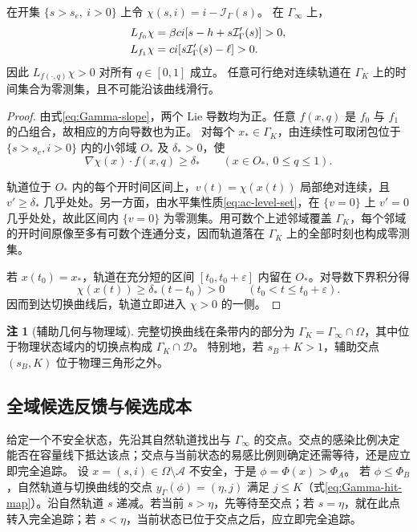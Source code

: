 \documentclass[lang=cn,a4paper,newtx]{elegantpaper}
\theoremstyle{plain}
\theoremstyle{definition}
\newtheorem{paperremark}[theorem]{注}
\newcommand{\Acal}{\mathcal A}
\newcommand{\Dcal}{\mathcal D}
\begin{document}
\begin{lemma}[所有允许方向均严格横穿切换曲线]
\label{lem:strict-crossing}
在开集 $\{s>s_e,\ i>0\}$ 上令 $\chi(s,i)=i-\mathcal I_\Gamma(s)$。
在 $\Gamma_\infty$ 上，
\begin{align}
L_{f_0}\chi&=\beta ci[s-h+s\mathcal I_\Gamma'(s)]>0,\notag\\
L_{f_1}\chi&=ci[s\mathcal I_\Gamma'(s)-\ell]>0.\label{eq:strict-crossing}
\end{align}
因此 $L_{f(\cdot,q)}\chi>0$ 对所有 $q\in[0,1]$ 成立。
任意可行绝对连续轨道在 $\Gamma_K$ 上的时间集合为零测集，且不可能沿该曲线滑行。
\end{lemma}
\begin{proof}
由式\eqref{eq:Gamma-slope}，两个 Lie 导数均为正。任意 $f(x,q)$ 是 $f_0$ 与 $f_1$ 的凸组合，故相应的方向导数也为正。
对每个 $x_*\in\Gamma_K$，由连续性可取闭包位于 $\{s>s_e,i>0\}$ 内的小邻域 $O_*$ 及 $\delta_*>0$，使
\[
\nabla\chi(x)\cdot f(x,q)\ge\delta_*\qquad(x\in O_*,\ 0\le q\le1).
\]

轨道位于 $O_*$ 内的每个开时间区间上，$v(t)=\chi(x(t))$ 局部绝对连续，且 $v'\ge\delta_*$ 几乎处处。另一方面，由水平集性质\eqref{eq:ac-level-set}，在 $\{v=0\}$ 上 $v'=0$ 几乎处处，故此区间内 $\{v=0\}$ 为零测集。用可数个上述邻域覆盖 $\Gamma_K$，每个邻域的开时间原像至多有可数个连通分支，因而轨道落在 $\Gamma_K$ 上的全部时刻也构成零测集。

若 $x(t_0)=x_*$，轨道在充分短的区间 $[t_0,t_0+\varepsilon]$ 内留在 $O_*$。对导数下界积分得
\begin{equation}
\chi(x(t))\ge\delta_*(t-t_0)>0\qquad(t_0<t\le t_0+\varepsilon).
\label{eq:strict-crossing-time}
\end{equation}
因而到达切换曲线后，轨道立即进入 $\chi>0$ 的一侧。
\end{proof}

\begin{paperremark}[辅助几何与物理域]
完整切换曲线在条带内的部分为 $\Gamma_K=\Gamma_\infty\cap\Omega$，其中位于物理状态域内的切换点构成 $\Gamma_K\cap\Dcal$。
特别地，若 $s_B+K>1$，辅助交点 $(s_B,K)$ 位于物理三角形之外。
\end{paperremark}

\subsection{全域候选反馈与候选成本}
\label{sec:synthesis}
给定一个不安全状态，先沿其自然轨道找出与 $\Gamma_\infty$ 的交点。交点的感染比例决定能否在容量线下抵达该点；交点与当前状态的易感比例则确定还需等待，还是应立即完全追踪。
设 $x=(s,i)\in\Omega\setminus\Acal$ 不安全，于是 $\phi=\Phi(x)>\Phi_A$。
若 $\phi\le\Phi_B$，自然轨道与切换曲线的交点 $y_\Gamma(\phi)=(\eta,j)$ 满足 $j\le K$（式\eqref{eq:Gamma-hit-map}）。沿自然轨道 $s$ 递减。若当前 $s>\eta$，先等待至交点；若 $s=\eta$，就在此点转入完全追踪；若 $s<\eta$，当前状态已位于交点之后，应立即完全追踪。
\end{document}
